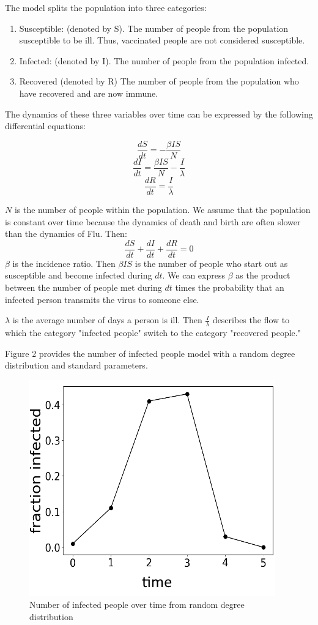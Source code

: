 The model splits the population into three categories: 
\begin{enumerate}
    \item Susceptible: (denoted by S). The number of people from the population susceptible to be ill. Thus, vaccinated people are not considered susceptible.
    \item Infected: (denoted by I). The number of people from the population infected.
    \item Recovered (denoted by R) The number of people from the population who have recovered and are now immune.
    
\end{enumerate}

The dynamics of these three variables over time can be expressed by the following differential equations:

$${\frac  {dS}{dt}}=-{\frac  {\beta IS}{N}}$$
$${\frac  {dI}{dt}}={\frac  {\beta IS}{N}}-\frac{I}{\lambda}$$
$${\frac  {dR}{dt}}=\frac{I}{\lambda}$$

$N$ is the number of people within the population. We assume that the population is constant over time because the dynamics of death and birth are often slower than the dynamics of Flu. Then:
$${\frac  {dS}{dt}}+{\frac  {dI}{dt}}+{\frac  {dR}{dt}}=0$$
$\beta$ is the incidence ratio. Then $\beta I S$ is the number of people who start out as susceptible and become infected during $dt$. We can express $\beta$ as the product between the number of people met during $dt$ times the probability that an infected person transmits the virus to someone else.


$\lambda$ is the average number of days a person is ill. Then $\frac{I}{\lambda}$ describes the flow to which the category "infected people" switch to the category "recovered people."

Figure 2 provides the number of infected people model with a random degree distribution and standard parameters.

\begin{figure}
    \centering
    \includegraphics[scale=0.5]{Capture_2.PNG}
    \caption{Number of infected people over time from random degree distribution}
    \label{fig:my_label}
\end{figure}



